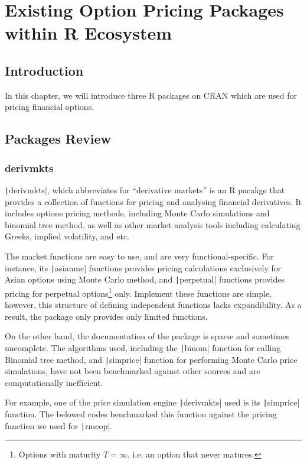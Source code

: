 \chapter{Existing Option Pricing Packages within R Ecosystem} \label{cpt:Existing Packages}

\section{Introduction}

In this chapter, we will introduce three R packages on CRAN which are used for pricing financial options.

\section{Packages Review}

\subsection{derivmkts} \label{sub:derivmkts}

\texttt|derivmkts|, which abbreviates for ``derivative markets'' is an R pacakge that provides a collection of functions for pricing and analysing financial derivatives. It includes options pricing methods, including Monte Carlo simulations and binomial tree method, as well as other market analysis tools including calculating Greeks, implied volatility, and etc.

The market functions are easy to use, and are very functional-specific. For instance, its \texttt|asianmc| functions provides pricing calculations exclusively for Asian options using Monte Carlo method, and \texttt|perpetual| functions provides pricing for perpetual options\footnote{Options with maturity $T=\infty$, i.e. an option that never matures.} only. Implement these functions are simple, however, this structure of defining independent functions lacks expandibility. As a result, the package only provides only limited functions.

On the other hand, the documentation of the package is sparse and sometimes uncomplete. The algorithms used, including the \texttt|binom| function for calling Binomial tree method, and \texttt|simprice| function for performing Monte Carlo price simulations, have not been benchmarked against other sources and are computationally inefficient.

For example, one of the price simulation engine \texttt|derivmkts| used is its \texttt|simprice| function. The belowed codes benchmarked this function against the pricing function we used for \texttt|rmcop|.

